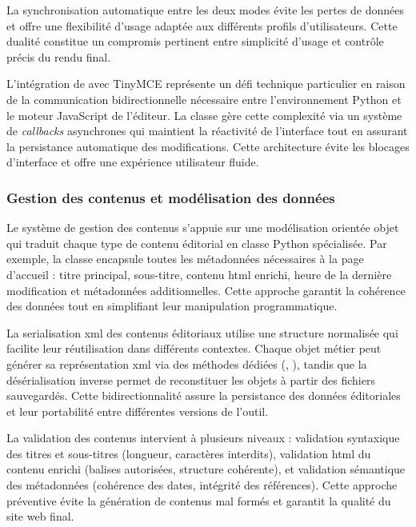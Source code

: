 La synchronisation automatique entre les deux modes évite les pertes de données et offre une flexibilité d'usage adaptée aux différents profils d'utilisateurs. Cette dualité constitue un compromis pertinent entre simplicité d'usage et contrôle précis du rendu final.

L'intégration de  avec TinyMCE représente un défi technique particulier en raison de la communication bidirectionnelle nécessaire entre l'environnement Python et le moteur JavaScript de l'éditeur. La classe  gère cette complexité via un système de \textit{\glspl{callback}} asynchrones qui maintient la réactivité de l'interface tout en assurant la persistance automatique des modifications. Cette architecture évite les blocages d'interface et offre une expérience utilisateur fluide.

\subsubsection{Gestion des contenus et modélisation des données}

Le système de gestion des contenus s'appuie sur une modélisation orientée objet qui traduit chaque type de contenu éditorial en classe Python spécialisée. Par exemple, la classe  encapsule toutes les métadonnées nécessaires à la page d'accueil : titre principal, sous-titre, contenu \gls{html} enrichi, heure de la dernière modification et métadonnées additionnelles. Cette approche garantit la cohérence des données tout en simplifiant leur manipulation programmatique.

La \gls{serialisation} \gls{xml} des contenus éditoriaux utilise une structure normalisée qui facilite leur réutilisation dans différents contextes. Chaque objet métier peut générer sa représentation \gls{xml} via des méthodes dédiées (, ), tandis que la désérialisation inverse permet de reconstituer les objets à partir des fichiers sauvegardés. Cette bidirectionnalité assure la persistance des données éditoriales et leur portabilité entre différentes versions de l'outil.

La validation des contenus intervient à plusieurs niveaux : validation syntaxique des titres et sous-titres (longueur, caractères interdits), validation \gls{html} du contenu enrichi (balises autorisées, structure cohérente), et validation sémantique des métadonnées (cohérence des dates, intégrité des références). Cette approche préventive évite la génération de contenus mal formés et garantit la qualité du site web final.


